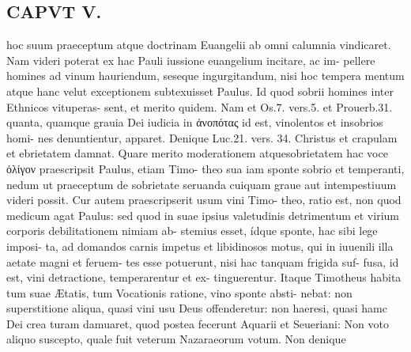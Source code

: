 \documentclass{article}
\begin{document}
\begin{pages}
\section*{CAPVT V. }
\marginpar{[ p.369 ]}hoc suum praeceptum atque doctrinam Euangelii ab omni calumnia vindicaret. Nam videri poterat ex hac Pauli iussione euangelium incitare, ac im- pellere homines ad vinum hauriendum, seseque ingurgitandum, nisi hoc tempera mentum atque hanc velut exceptionem subtexuisset Paulus. Id quod sobrii homines inter Ethnicos vituperas- sent, et merito quidem. Nam et Os.7. vers.5. et Prouerb.31. quanta, quamque grauia Dei iudicia in ἀνοπότας id est, vinolentos et insobrios homi- nes denuntientur, apparet. Denique Luc.21. vers. 34. Christus et crapulam et ebrietatem damnat. Quare merito moderationem atquesobrietatem hac voce ὀλίγον praescripsit Paulus, etiam Timo- theo sua iam sponte sobrio et temperanti, nedum ut praeceptum de sobrietate seruanda cuiquam graue aut intempestiuum videri possit. Cur autem praescripserit usum vini Timo- theo, ratio est, non quod medicum agat Paulus: sed quod in suae ipsius valetudinis detrimentum et virium corporis debilitationem nimiam ab- stemius esset, ídque sponte, hac sibi lege imposi- ta, ad domandos carnis impetus et libidinosos motus, qui in iuuenili illa aetate magni et feruem- tes esse potuerunt, nisi hac tanquam frigida suf- fusa, id est, vini detractione, temperarentur et ex- tinguerentur. Itaque Timotheus habita tum suae Ætatis, tum Vocationis ratione, vino sponte absti- nebat: non superstitione aliqua, quasi vini usu Deus offenderetur: non haeresi, quasi hamc Dei crea turam damuaret, quod postea fecerunt Aquarii et Seueriani: Non voto aliquo suscepto, quale fuit veterum Nazaraeorum votum. Non denique 

\end{pages}
\end{document}

